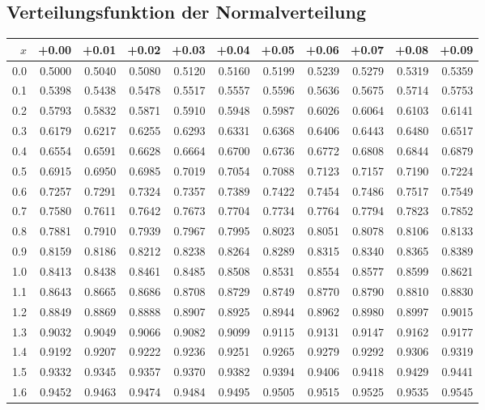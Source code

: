 	\subsection{Verteilungsfunktion der Normalverteilung}
	\label{tbl_NormVerteilung}
	\begin{minipage}{\textwidth}
    	\centering
\begin{tabular}{|r|rrrrrrrrrr|}
\hline
$x$&+0.00&+0.01&+0.02&+0.03&+0.04&+0.05&+0.06&+0.07&+0.08&+0.09\\
\hline
\rowcolor[gray]{.9}
0.0&0.5000&0.5040&0.5080&0.5120&0.5160&0.5199&0.5239&0.5279&0.5319&0.5359\\
0.1&0.5398&0.5438&0.5478&0.5517&0.5557&0.5596&0.5636&0.5675&0.5714&0.5753\\
\rowcolor[gray]{.9}
0.2&0.5793&0.5832&0.5871&0.5910&0.5948&0.5987&0.6026&0.6064&0.6103&0.6141\\
0.3&0.6179&0.6217&0.6255&0.6293&0.6331&0.6368&0.6406&0.6443&0.6480&0.6517\\
\rowcolor[gray]{.9}
0.4&0.6554&0.6591&0.6628&0.6664&0.6700&0.6736&0.6772&0.6808&0.6844&0.6879\\
0.5&0.6915&0.6950&0.6985&0.7019&0.7054&0.7088&0.7123&0.7157&0.7190&0.7224\\
\rowcolor[gray]{.9}
0.6&0.7257&0.7291&0.7324&0.7357&0.7389&0.7422&0.7454&0.7486&0.7517&0.7549\\
0.7&0.7580&0.7611&0.7642&0.7673&0.7704&0.7734&0.7764&0.7794&0.7823&0.7852\\
\rowcolor[gray]{.9}
0.8&0.7881&0.7910&0.7939&0.7967&0.7995&0.8023&0.8051&0.8078&0.8106&0.8133\\
0.9&0.8159&0.8186&0.8212&0.8238&0.8264&0.8289&0.8315&0.8340&0.8365&0.8389\\
\rowcolor[gray]{.9}
1.0&0.8413&0.8438&0.8461&0.8485&0.8508&0.8531&0.8554&0.8577&0.8599&0.8621\\
1.1&0.8643&0.8665&0.8686&0.8708&0.8729&0.8749&0.8770&0.8790&0.8810&0.8830\\
\rowcolor[gray]{.9}
1.2&0.8849&0.8869&0.8888&0.8907&0.8925&0.8944&0.8962&0.8980&0.8997&0.9015\\
1.3&0.9032&0.9049&0.9066&0.9082&0.9099&0.9115&0.9131&0.9147&0.9162&0.9177\\
\rowcolor[gray]{.9}
1.4&0.9192&0.9207&0.9222&0.9236&0.9251&0.9265&0.9279&0.9292&0.9306&0.9319\\
1.5&0.9332&0.9345&0.9357&0.9370&0.9382&0.9394&0.9406&0.9418&0.9429&0.9441\\
\rowcolor[gray]{.9}
1.6&0.9452&0.9463&0.9474&0.9484&0.9495&0.9505&0.9515&0.9525&0.9535&0.9545\\

\end{tabular}
\end{minipage}
